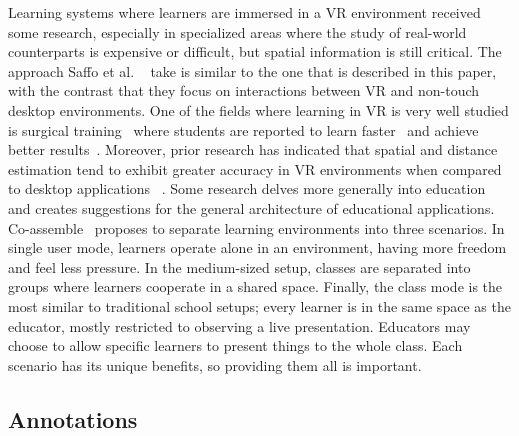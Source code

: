 Learning systems where learners are immersed in a VR environment received some research, especially in specialized areas where the study of real-world counterparts is expensive or difficult, but spatial information is still critical. The approach Saffo et al. ~\cite{desktopVRCombination} take is similar to the one that is described in this paper, with the contrast that they focus on interactions between VR and non-touch desktop environments. One of the fields where learning in VR is very well studied is surgical training~\cite{vrMedicalTraining, vrMedicalTraining2, vrMedicalTraining3,hombeck2024voice,laparoscopyInstrumentVR} where students are reported to learn faster~\cite{vrFasterLearning} and achieve better results~\cite{vrMedicalBetter}. Moreover, prior research has indicated that spatial and distance estimation tend to exhibit greater accuracy in VR environments when compared to desktop applications ~\cite{unityInterface2,hombeck2022distance,hombeck2019evaluation}.
%
Some research delves more generally into education and creates suggestions for the general architecture of educational applications. Co-assemble~\cite{coAssemble} proposes to separate learning environments into three scenarios. In single user mode, learners operate alone in an environment, having more freedom and feel less pressure. In the medium-sized setup, classes are separated into groups where learners cooperate in a shared space. Finally, the class mode is the most similar to traditional school setups; every learner is in the same space as the educator, mostly restricted to observing a live presentation. Educators may choose to allow specific learners to present things to the whole class. Each scenario has its unique benefits, so providing them all is important.

\subsection{Annotations}

